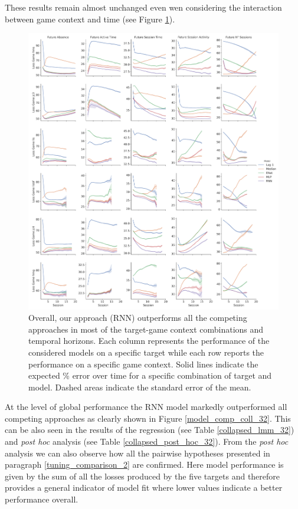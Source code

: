 These results remain almost unchanged even wen considering the interaction between game context and time (see Figure \ref{model_comp_non_coll_32}).
\begin{figure}[h]
\centering
\includegraphics[height=0.7\textheight,keepaspectratio]{images/chapter_3/models_comparison_non_collapsed_32.png}
\caption[\textbf{Model comparison without collapsing}]{ Overall, our approach (RNN) outperforms all the competing approaches in most of the target-game context combinations and temporal horizons. Each column represents the performance of the considered models on a specific target while each row reports the performance on a specific game context. Solid lines indicate the expected \% error over time for a specific combination of target and model. Dashed areas indicate the standard error of the mean.}
\label{model_comp_non_coll_32} 
\end{figure}
At the level of global performance the RNN model markedly outperformed all competing approaches as clearly shown in Figure \ref{model_comp_coll_32}. This can be also seen in the results of the regression (see Table \ref{collapsed_lmm_32}) and  \textit{post hoc} analysis (see Table \ref{collapsed_post_hoc_32}). From the \textit{post hoc} analysis we can also observe how all the pairwise hypotheses presented in paragraph \ref{tuning_comparison_2} are confirmed. Here model performance is given by the sum of all the losses produced by the five targets and therefore provides a general indicator of model fit where lower values indicate a better performance overall.
